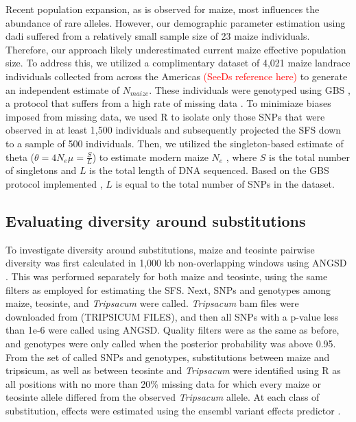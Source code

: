 \documentclass{pnastwo}
\begin{document}
\begin{article}
\begin{materials}
Recent population expansion, as is observed for maize, most influences
the abundance of rare alleles. However, our demographic parameter
estimation using dadi suffered from a relatively small sample size of
23 maize individuals. Therefore, our approach likely underestimated
current maize effective population size. To address this, we utilized
a complimentary dataset of 4,021 maize landrace individuals collected
from across the Americas \textcolor{red}{(SeeDs reference here)} to
generate an independent estimate of
$N_{maize}$. These individuals were genotyped using GBS
\cite{elshire2011}, a protocol that suffers from a high rate of
missing data \cite{beissinger2013}. To minimiaze biases imposed from
missing data, we used R to isolate only those SNPs that
were observed in at least 1,500 individuals and subsequently projected the
SFS down to a sample of 500 individuals. Then, we utilized the singleton-based estimate of
theta ($\theta = 4N_e\mu = \frac{S}{L}$) to estimate
modern maize $N_e$ \cite{fu1993}, where $S$ is the total number of
singletons and $L$ is the total length of DNA sequenced. Based on the
GBS protocol implemented \cite{elshire2011}, $L$ is equal to the total
number of SNPs in the dataset.

\subsection{Evaluating diversity around substitutions}
To investigate diversity around substitutions, maize and teosinte pairwise diversity was first
calculated in 1,000 kb non-overlapping windows using ANGSD
\cite{korneliussen2014}. This was performed separately for both maize and
teosinte, using the same filters as employed for estimating the
SFS. Next, SNPs and genotypes among maize, teosinte, and \emph{Tripsacum} were called. \emph{Tripsacum} bam files
were downloaded from \url{}(TRIPSICUM FILES), and then all SNPs with a
p-value less than 1e-6 were called using ANGSD. Quality filters were
as the same as before, and genotypes were only called when the
posterior probability was above 0.95. From the set of called SNPs and
genotypes, substitutions between maize and tripsicum, as well as
between teosinte and \emph{Tripsacum} were identified using R \cite{R2014} as all positions with
no more than 20\% missing data for which every maize or teosinte
allele differed from the observed \emph{Tripsacum} allele. At each class of
substitution, effects were estimated using the ensembl variant effects
predictor \cite{mclaren2010}.


\end{materials}
\end{article}
\end{document}

